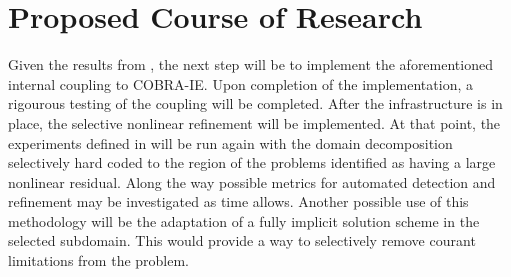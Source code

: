 \chapter{Proposed Course of Research}

Given the results from , the next step will be to implement the aforementioned internal coupling to COBRA-IE.
Upon completion of the implementation, a rigourous testing of the coupling will be completed.
After the infrastructure is in place, the selective nonlinear refinement will be implemented.
At that point, the experiments defined in  will be run again with the domain decomposition selectively hard coded to the region of the problems identified as having a large nonlinear residual.
Along the way possible metrics for automated detection and refinement may be investigated as time allows.
Another possible use of this methodology will be the adaptation of a fully implicit solution scheme in the selected subdomain.
This would provide a way to selectively remove courant limitations from the problem.